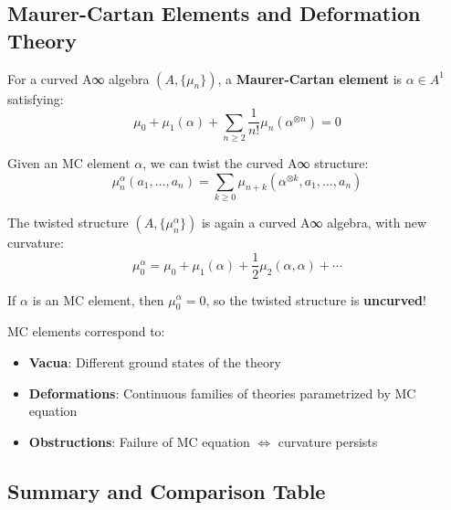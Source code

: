 \subsection{Maurer-Cartan Elements and Deformation Theory}
\label{sec:maurer-cartan-curved}

\begin{definition}
\label{def:mc-element-curved}
For a curved A∞ algebra $(A, \{\mu_n\})$, a \textbf{Maurer-Cartan element} is $\alpha 
\in A^1$ satisfying:
\begin{equation}
\mu_0 + \mu_1(\alpha) + \sum_{n \geq 2} \frac{1}{n!} \mu_n(\alpha^{\otimes n}) = 0
\end{equation}
\end{definition}

\begin{theorem}
\label{thm:twisting-mc}
Given an MC element $\alpha$, we can twist the curved A∞ structure:
\begin{equation}
\mu_n^\alpha(a_1, \ldots, a_n) = \sum_{k \geq 0} \mu_{n+k}(\alpha^{\otimes k}, 
a_1, \ldots, a_n)
\end{equation}

The twisted structure $(A, \{\mu_n^\alpha\})$ is again a curved A∞ algebra, with new 
curvature:
\begin{equation}
\mu_0^\alpha = \mu_0 + \mu_1(\alpha) + \frac{1}{2}\mu_2(\alpha, \alpha) + \cdots
\end{equation}

If $\alpha$ is an MC element, then $\mu_0^\alpha = 0$, so the twisted structure is 
\textbf{uncurved}!
\end{theorem}

\begin{remark}
MC elements correspond to:
\begin{itemize}
\item \textbf{Vacua}: Different ground states of the theory
\item \textbf{Deformations}: Continuous families of theories parametrized by MC equation
\item \textbf{Obstructions}: Failure of MC equation $\Leftrightarrow$ curvature persists
\end{itemize}
\end{remark}

\subsection{Summary and Comparison Table}
\label{sec:curved-summary}

